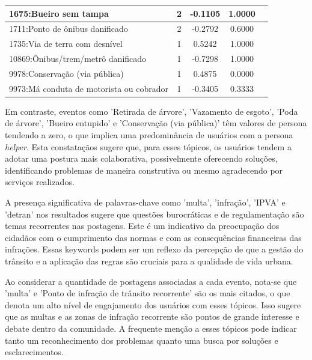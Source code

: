 \begin{table}[htbp]
\begin{tabular}{|l|c|c|c|c|}
		\hline
		1675:Bueiro sem tampa                             & 2                & -0.1105        & 1.0000           \\
		\hline
		1711:Ponto de ônibus danificado                   & 2                & -0.2792        & 0.6000           \\
		\hline
		1735:Via de terra com desnível                    & 1                & 0.5242         & 1.0000           \\
		\hline
		10869:Ônibus/trem/metrô danificado                & 1                & -0.7298        & 1.0000           \\
		\hline
		9978:Conservação (via pública)                    & 1                & 0.4875         & 0.0000           \\
		\hline
		9973:Má conduta de motorista ou cobrador          & 1                & -0.3405        & 0.3333           \\
		\hline
	\end{tabular}
\end{table}

Em contraste, eventos como 'Retirada de árvore', 'Vazamento de esgoto', 'Poda de árvore', 'Bueiro entupido' e 'Conservação (via pública)' têm valores de persona tendendo a zero, o que implica uma predominância de usuários com a persona \textit{helper}. Esta constataçãos sugere que, para esses tópicos, os usuários tendem a adotar uma postura mais colaborativa, possivelmente oferecendo soluções, identificando problemas de maneira construtiva ou mesmo agradecendo por serviços realizados.

A presença significativa de palavras-chave como 'multa', 'infração', 'IPVA' e 'detran' nos resultados sugere que questões burocráticas e de regulamentação são temas recorrentes nas postagens. Este é um indicativo da preocupação dos cidadãos com o cumprimento das normas e com as consequências financeiras das infrações. Essas keywords podem ser um reflexo da percepção de que a gestão do trânsito e a aplicação das regras são cruciais para a qualidade de vida urbana.

Ao considerar a quantidade de postagens associadas a cada evento, nota-se que 'multa' e 'Ponto de infração de trânsito recorrente' são os mais citados, o que denota um alto nível de engajamento dos usuários com esses tópicos. Isso sugere que as multas e as zonas de infração recorrente são pontos de grande interesse e debate dentro da comunidade. A frequente menção a esses tópicos pode indicar tanto um reconhecimento dos problemas quanto uma busca por soluções e esclarecimentos.

